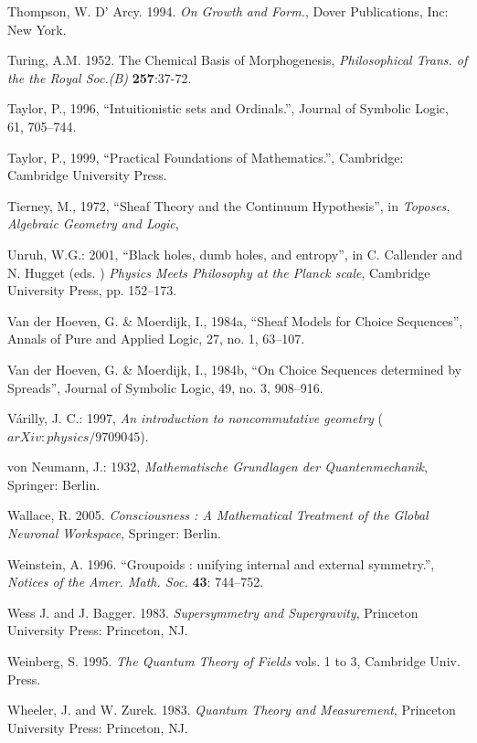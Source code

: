 \documentclass[12pt]{article}
\begin{document}
\begin{thebibliography}{399}
Thompson, W. D' Arcy. 1994. \emph{On Growth and Form.}, Dover Publications, Inc: New York.

\bibitem
 Turing, A.M. 1952. The Chemical Basis of Morphogenesis, \emph{Philosophical Trans. of the the Royal Soc.(B)} \textbf {257}:37-72.

Taylor, P., 1996, ``Intuitionistic sets and Ordinals.'', Journal of Symbolic Logic, 61, 705--744.
 
Taylor, P., 1999, ``Practical Foundations of Mathematics.'', Cambridge: Cambridge University Press. 

Tierney, M., 1972, ``Sheaf Theory and the Continuum Hypothesis'', in {\em Toposes, Algebraic Geometry and Logic}, 

Unruh, W.G.: 2001, ``Black holes, dumb holes, and entropy'', in C. Callender and N. Hugget (eds. ) \emph{Physics Meets Philosophy at
the Planck scale}, Cambridge University Press, pp. 152--173.

Van der Hoeven, G. \& Moerdijk, I., 1984a, ``Sheaf Models for Choice Sequences'', Annals of Pure and Applied Logic, 27, no. 1, 63--107. 

Van der Hoeven, G. \& Moerdijk, I., 1984b, ``On Choice Sequences determined by Spreads'', Journal of Symbolic Logic, 49, no. 3, 908--916. 

V\'arilly, J. C.: 1997, \emph{An introduction to noncommutative geometry} 
 ($arXiv:physics/9709045$).


von Neumann, J.: 1932, \emph{Mathematische Grundlagen der Quantenmechanik}, Springer: Berlin.

Wallace, R. 2005. \emph{Consciousness : A Mathematical Treatment of the Global Neuronal Workspace}, Springer: Berlin.

Weinstein, A. 1996. ``Groupoids : unifying internal and external symmetry.'', \emph{Notices of the Amer. Math. Soc.} \textbf{43}: 744--752.

Wess J. and J. Bagger. 1983. \emph{Supersymmetry and Supergravity}, Princeton University Press: Princeton, NJ.

Weinberg, S. 1995. \emph{The Quantum Theory of Fields}  vols. 1 to 3, Cambridge Univ. Press.

Wheeler, J. and W. Zurek. 1983. \emph{Quantum Theory and Measurement}, Princeton University Press: Princeton, NJ.


\end{thebibliography}
\end{document}
